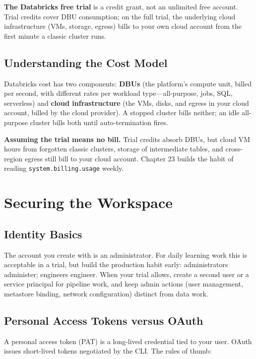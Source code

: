 \begin{definitionbox}
\textbf{The Databricks free trial} is a credit grant, not an unlimited free account. Trial credits cover DBU consumption; on the full trial, the underlying cloud infrastructure (VMs, storage, egress) bills to your own cloud account from the first minute a classic cluster runs.
\end{definitionbox}

\subsection{Understanding the Cost Model}
Databricks cost has two components: \textbf{DBUs} (the platform's compute unit, billed per second, with different rates per workload type---all-purpose, jobs, SQL, serverless) and \textbf{cloud infrastructure} (the VMs, disks, and egress in your cloud account, billed by the cloud provider). A stopped cluster bills neither; an idle all-purpose cluster bills both until auto-termination fires.

\begin{pitfall}
\textbf{Assuming the trial means no bill.} Trial credits absorb DBUs, but cloud VM hours from forgotten classic clusters, storage of intermediate tables, and cross-region egress still bill to your cloud account. Chapter 23 builds the habit of reading \texttt{system.billing.usage} weekly.
\end{pitfall}

\section{Securing the Workspace}
\subsection{Identity Basics}
The account you create with is an administrator. For daily learning work this is acceptable in a trial, but build the production habit early: administrators administer; engineers engineer. When your trial allows, create a second user or a service principal for pipeline work, and keep admin actions (user management, metastore binding, network configuration) distinct from data work.

\subsection{Personal Access Tokens versus OAuth}
A personal access token (PAT) is a long-lived credential tied to your user. OAuth issues short-lived tokens negotiated by the CLI. The rules of thumb:

